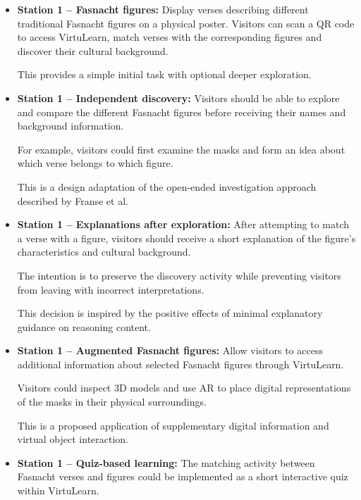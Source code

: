\begin{itemize}

    \item \textbf{Station 1 -- Fasnacht figures:}
    Display verses describing different traditional Fasnacht
    figures on a physical poster. Visitors can scan a QR code
    to access VirtuLearn, match verses with the corresponding
    figures and discover their cultural background.

    This provides a simple initial task with optional deeper
    exploration.
    \cite[pp.~139--141]{hornecker_learning_2006}

    \item \textbf{Station 1 -- Independent discovery:}
    Visitors should be able to explore and compare the
    different Fasnacht figures before receiving their
    names and background information.

    For example, visitors could first examine the masks
    and form an idea about which verse belongs to which
    figure.

    This is a design adaptation of the open-ended
    investigation approach described by Franse et al.
    \cite[pp.~708,~721--723]{franse_families_2021}

    \item \textbf{Station 1 -- Explanations after exploration:}
    After attempting to match a verse with a figure,
    visitors should receive a short explanation of the
    figure's characteristics and cultural background.

    The intention is to preserve the discovery activity
    while preventing visitors from leaving with
    incorrect interpretations.

    This decision is inspired by the positive effects
    of minimal explanatory guidance on reasoning content.
    \cite[pp.~727,~733--734]{franse_families_2021}

    \item \textbf{Station 1 -- Augmented Fasnacht figures:}
    Allow visitors to access additional information
    about selected Fasnacht figures through VirtuLearn.

    Visitors could inspect 3D models and use AR
    to place digital representations of the masks
    in their physical surroundings.

    This is a proposed application of supplementary
    digital information and virtual object interaction.
    \cite[pp.~6,~9--10]{zhou_meta-analytic_2022}

    \item \textbf{Station 1 -- Quiz-based learning:}
    The matching activity between Fasnacht verses
    and figures could be implemented as a short
    interactive quiz within VirtuLearn.


\end{itemize}
